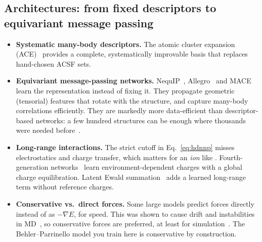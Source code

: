 \documentclass[11pt,a4paper]{article}
\begin{document}
\subsection{Architectures: from fixed descriptors to equivariant message passing}
\begin{itemize}
  \item \textbf{Systematic many-body descriptors.} The atomic cluster expansion
        (ACE)~\cite{Drautz2019} provides a complete, systematically improvable
        basis that replaces hand-chosen ACSF sets.
  \item \textbf{Equivariant message-passing networks.} NequIP~\cite{Batzner2022},
        Allegro~\cite{Musaelian2023} and MACE~\cite{Batatia2022} learn the
        representation instead of fixing it. They propagate geometric
        (tensorial) features that rotate with the structure, and capture
        many-body correlations efficiently. They are markedly more
        data-efficient than descriptor-based networks: a few hundred
        structures can be enough where thousands were needed
        before~\cite{Batzner2022}.
  \item \textbf{Long-range interactions.} The strict cutoff in
        Eq.~\eqref{eq:hdnnp} misses electrostatics and charge transfer, which
        matters for an \emph{ion} like . Fourth-generation
        networks~\cite{Ko2021} learn environment-dependent charges with a
        global charge equilibration. Latent Ewald summation~\cite{Cheng2024}
        adds a learned long-range term without reference charges.
  \item \textbf{Conservative vs.\ direct forces.} Some large models
        predict forces directly instead of as $-\nabla E$, for speed. This was
        shown to cause drift and instabilities in MD~\cite{Bigi2024}, so
        conservative forces are preferred, at least for
        simulation~\cite{Fu2025}. The Behler--Parrinello model you train here
        is conservative by construction.
\end{itemize}
\end{document}
